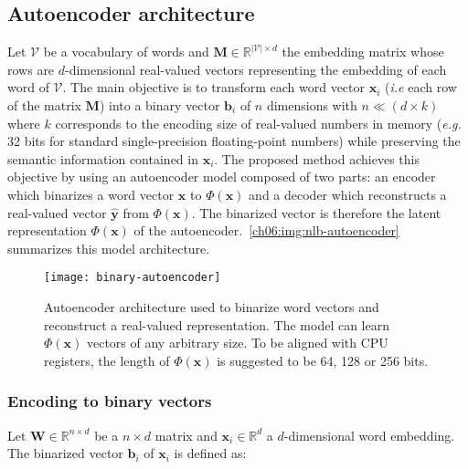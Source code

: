   \subsection{Autoencoder architecture}
    Let $\mathcal{V}$ be a vocabulary of words and $\mathbf{M} \in
    \mathbb{R}^{|\mathcal{V}| \times d}$ the embedding matrix whose rows are
    $d$-dimensional real-valued vectors representing the embedding of each word
    of $\mathcal{V}$. The main objective is to transform each word vector
    $\mathbf{x}_i$ (\textit{i.e} each row of the matrix $\mathbf{M}$) into a
    binary vector $\mathbf{b}_i$ of $n$ dimensions with $n \ll (d \times k)$
    where $k$ corresponds to the encoding size of real-valued numbers in memory
    (\textit{e.g.} 32 bits for standard single-precision floating-point numbers)
    while preserving the semantic information contained in $\mathbf{x}_i$. The
    proposed method achieves this objective by using an autoencoder model
    composed of two parts: an encoder which binarizes a word vector $\mathbf{x}$
    to $\Phi(\mathbf{x})$ and a decoder which reconstructs a real-valued vector
    $\hat{\mathbf{y}}$ from $\Phi(\mathbf{x})$. The binarized vector is
    therefore the latent representation $\Phi(\mathbf{x})$ of the
    autoencoder.~\autoref{ch06:img:nlb-autoencoder} summarizes this model
    architecture.

    \begin{figure}[h]
      \begin{center}
        \centerline{\texttt{[image: binary-autoencoder]}}
        \caption[Autoencoder architecture used to binarize word vectors.]
        {Autoencoder architecture used to binarize word vectors and reconstruct
        a real-valued representation. The model can learn $\Phi(\mathbf{x})$
        vectors of any arbitrary size. To be aligned with CPU registers, the
        length of $\Phi(\mathbf{x})$ is suggested to be 64, 128 or 256 bits.}
        \label{ch06:img:nlb-autoencoder}
      \end{center}
    \end{figure}

    \subsubsection{Encoding to binary vectors}
      Let $\mathbf{W} \in \mathbb{R}^{n \times d}$ be a $n \times d$ matrix and
      $\mathbf{x}_i \in \mathbb{R}^d$ a $d$-dimensional word embedding. The
      binarized vector $\mathbf{b}_i$ of $\mathbf{x}_i$ is defined as:

